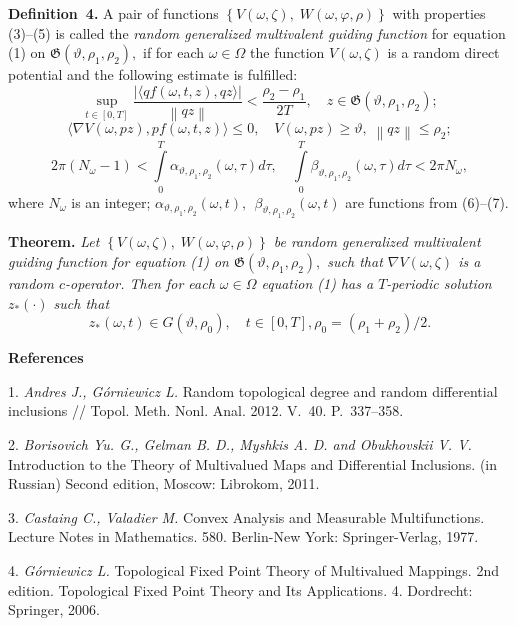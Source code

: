 \textbf{Definition~4.} A pair of functions $\left\{ {V(\omega,\zeta),\;W(\omega,\varphi,\rho )} \right\}$ with properties (3)--(5) is called the {\it random generalized multiva\-lent guiding function} for equation (1) on $\mathfrak{G}\left({\vartheta ,\rho _{1} ,\rho _{2} } \right),$ if for each $\omega\in\Omega$ the function $V(\omega,\zeta)$ is a random direct potential and the following estimate is fulfilled:
$$
\mathop {\sup}\limits_{t \in \left[ {0,T} \right]}\frac{{\left| {\langle {qf(\omega,t,z),qz} \rangle} \right|}}{{\left\|{qz} \right\|}} < \frac{{\rho _{2} - \rho _{1} }}{{2T}},\quad z\in \mathfrak{G} (\vartheta ,\rho _{1} ,\rho _{2} );
$$
$$
\langle\nabla V(\omega,pz),pf(\omega,t,z)\rangle \leqslant 0,\quad V(\omega,pz) \geqslant \vartheta ,\;\left\| {qz} \right\| \leqslant \rho _{2};
$$
$$
2\pi (N_{\omega} - 1) < \int\limits_{0}^{T} {\alpha_{\vartheta ,\rho _{1} ,\rho _{2} } (\omega,\tau )d\tau } , \quad
\int\limits_{0}^{T} {\beta _{\vartheta ,\rho _{1} ,\rho _{2} } (\omega,\tau )d\tau < 2\pi N_{\omega}},
$$
where $N_{\omega}$ is an integer; $\alpha _{\vartheta ,\rho_{1} ,\rho _{2} } (\omega,t),\,\;\beta _{\vartheta ,\rho _{1} ,\rho _{2}} (\omega,t)$ are functions from  (6)--(7).

\textbf{Theorem.} {\it Let $\left\{ {V(\omega,\zeta),\;W(\omega,\varphi,\rho )} \right\}$ be random generalized multivalent guiding function for equation (1) on $\mathfrak{G}\left({\vartheta ,\rho _{1} ,\rho _{2} } \right),$ such that $\nabla V(\omega,\zeta)$ is a random $c$-operator. Then for each $\omega\in\Omega$ equation (1) has a $T$-periodic solution $z_{ * } ( \cdot )$  such that
$$
z_{ * } (\omega,t) \in G(\vartheta,\rho _{0}),\quad t \in [0,T], \rho _{0} = \left( {\rho _{1} + \rho _{2} } \right)/2.
$$}
\smallskip \centerline{\bf References}\nopagebreak

1. {\it Andres J., G\'orniewicz L.} Random topological degree and random differential inclusions // Topol. Meth. Nonl. Anal. 2012. V.\, 40. P.\, 337--358.

2. {\it Borisovich Yu. G., Gelman B. D., Myshkis A. D. and Obukhovskii V. V.} Introduction to the Theory of Multivalued Maps and Differential Inclusions. (in Russian) Second edition, Moscow: Librokom, 2011.

3. {\it Castaing C., Valadier M.} Convex Analysis and Measurable Multifunctions. Lecture Notes in Mathematics. 580. Berlin-New York: Springer-Verlag, 1977.

4. {\it G\'{o}rniewicz L.} Topological Fixed Point Theory of Multi\-valued Mappings. 2nd edition. Topological Fixed Point Theory and Its Applications. 4. Dordrecht: Springer, 2006.

